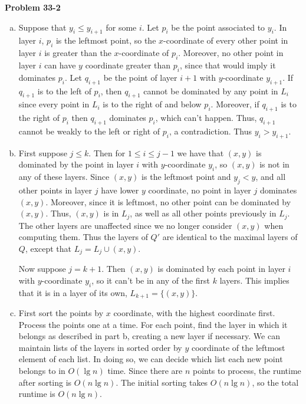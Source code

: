 \documentclass{article}
\begin{document}
\noindent\textbf{Problem 33-2}\\
\begin{enumerate}[a.]
\item Suppose that $y_i \leq y_{i+1}$ for some $i$.  Let $p_i$ be the point associated to $y_i$.  In layer $i$, $p_i$ is the leftmost point, so the $x$-coordinate of every other point in layer $i$ is greater than the $x$-coordinate of $p_i$.  Moreover, no other point in layer $i$ can have $y$ coordinate greater than $p_i$, since that would imply it dominates $p_i$.  Let $q_{i+1}$ be the point of layer $i+1$ with $y$-coordinate $y_{i+1}$.  If $q_{i+1}$ is to the left of $p_i$, then $q_{i+1}$ cannot be dominated by any point in $L_i$ since every point in $L_i$ is to the right of and below $p_i$.  Moreover, if $q_{i+1}$ is to the right of $p_i$ then $q_{i+1}$ dominates $p_i$, which can't happen. Thus, $q_{i+1}$ cannot be weakly to the left or right of $p_i$, a contradiction. Thus $y_i > y_{i+1}$. 

\item First suppose $j \leq k$.  Then for $1 \leq i \leq j-1$ we have that $(x,y)$ is dominated by the point in layer $i$ with $y$-coordinate $y_i$, so $(x,y)$ is not in any of these layers.  Since $(x,y)$ is the leftmost point and $y_j < y$, and all other points in layer $j$ have lower $y$ coordinate, no point in layer $j$ dominates $(x,y)$.  Moreover, since it is leftmost, no other point can be dominated by $(x,y)$. Thus, $(x,y)$ is in $L_j$, as well as all other points previously in $L_j$.  The other layers are unaffected since we no longer consider $(x,y)$ when computing them.  Thus the layers of $Q'$ are identical to the maximal layers of $Q$, except that $L_j = L_j \cup (x,y)$. 

Now suppose $j=k+1$.  Then $(x,y)$ is dominated by each point in layer $i$ with $y$-coordinate $y_i$, so it can't be in any of the first $k$ layers.  This implies that it is in a layer of its own, $L_{k+1}=\{(x,y)\}$. 

\item First sort the points by $x$ coordinate, with the highest coordinate first.  Process the points one at a time.  For each point, find the layer in which it belongs as described in part b, creating a new layer if necessary.  We can maintain lists of the layers in sorted order by $y$ coordinate of the leftmost element of each list.  In doing so, we can decide which list each new point belongs to in $O(\lg n)$ time.  Since there are $n$ points to process, the runtime after sorting is $O(n\lg n)$.  The initial sorting takes $O(n \lg n)$, so the total runtime is $O(n \lg n)$. 


\end{enumerate}
\end{document}
